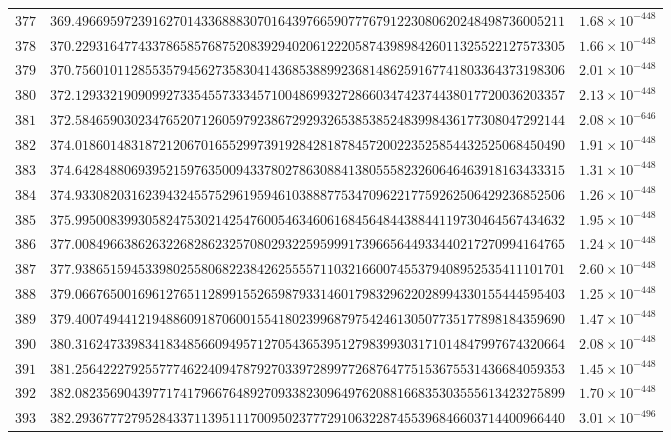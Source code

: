 \documentclass[12pt,reqno]{amsart}
\theoremstyle{remark}
\begin{document}
\begin{longtable}{clc}
$377$ & $369.4966959723916270143368883070164397665907776791223080620248498736005211$ & $1.68\times 10^{-448}$ \\
$378$ & $370.2293164774337865857687520839294020612220587439898426011325522127573305$ & $1.66\times 10^{-448}$ \\
$379$ & $370.7560101128553579456273583041436853889923681486259167741803364373198306$ & $2.01\times 10^{-448}$ \\
$380$ & $372.1293321909099273354557333457100486993272866034742374438017720036203357$ & $2.13\times 10^{-448}$ \\
$381$ & $372.5846590302347652071260597923867292932653853852483998436177308047292144$ & $2.08\times 10^{-646}$ \\
$382$ & $374.0186014831872120670165529973919284281878457200223525854432525068450490$ & $1.91\times 10^{-448}$ \\
$383$ & $374.6428488069395215976350094337802786308841380555823260646463918163433315$ & $1.31\times 10^{-448}$ \\
$384$ & $374.9330820316239432455752961959461038887753470962217759262506429236852506$ & $1.26\times 10^{-448}$ \\
$385$ & $375.9950083993058247530214254760054634606168456484438844119730464567434632$ & $1.95\times 10^{-448}$ \\
$386$ & $377.0084966386263226828623257080293225959991739665644933440217270994164765$ & $1.24\times 10^{-448}$ \\
$387$ & $377.9386515945339802558068223842625555711032166007455379408952535411101701$ & $2.60\times 10^{-448}$ \\
$388$ & $379.0667650016961276511289915526598793314601798329622028994330155444595403$ & $1.25\times 10^{-448}$ \\
$389$ & $379.4007494412194886091870600155418023996879754246130507735177898184359690$ & $1.47\times 10^{-448}$ \\
$390$ & $380.3162473398341834856609495712705436539512798399303171014847997674320664$ & $2.08\times 10^{-448}$ \\
$391$ & $381.2564222792557774622409478792703397289977268764775153675531436684059353$ & $1.45\times 10^{-448}$ \\
$392$ & $382.0823569043977174179667648927093382309649762088166835303555613423275899$ & $1.70\times 10^{-448}$ \\
$393$ & $382.2936777279528433711395111700950237772910632287455396846603714400966440$ & $3.01\times 10^{-496}$ \\

\end{longtable}
\end{document}
